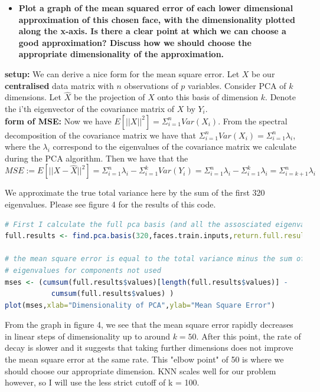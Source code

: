 \documentclass[11pt]{article}
\begin{document}
\begin{itemize}
\item \textbf{Plot a graph of the mean squared error of each lower dimensional approximation of this chosen face, with the dimensionality plotted along the x-axis. Is there a clear point at which we can choose a good approximation? Discuss how we should choose the appropriate dimensionality of the approximation.}
\end{itemize}
\textbf{setup:}
We can derive a nice form for the mean square error. Let $X$ be our \textbf{centralised} data matrix with $n$ observations of $p$ variables. Consider PCA of $k$ dimensions. Let $\hat{X}$ be the projection of $X$ onto this basis of dimension $k$. Denote the i'th eigenvector of the covariance matrix of $X$ by $Y_{i}$. \\
\textbf{form of MSE:}
Now we have $E[||X||^{2}] = \Sigma_{i=1}^{n} Var(X_{i})$. From the spectral decomposition of the covariance matrix we have that $\Sigma_{i=1}^{n} Var(X_{i}) = \Sigma_{i=1}^{n} \lambda_{i}$, where the $\lambda_{i}$ correspond to the eigenvalues of the covariance matrix we calculate during the PCA algorithm. Then we have that the $MSE := E[||X - \hat{X}  ||^{2}] = \Sigma_{i=1}^{n} \lambda_{i} - \Sigma_{i=1}^{k} Var(Y_{i}) =  \Sigma_{i=1}^{n} \lambda_{i} - \Sigma_{i=1}^{k} \lambda_{i} = \Sigma_{i=k+1}^{n} \lambda_{i}$

We approximate the true total variance here by the sum of the first 320 eigenvalues. Please see figure 4 for the results of this code. 

\begin{lstlisting}[linewidth=18.4cm,language=R]
# First I calculate the full pca basis (and all the assosciated eigenvalues)
full.results <- find.pca.basis(320,faces.train.inputs,return.full.results = TRUE)

# the mean square error is equal to the total variance minus the sum of the 
# eigenvalues for components not used 
mses <- (cumsum(full.results$values)[length(full.results$values)] - 
           cumsum(full.results$values) )
plot(mses,xlab="Dimensionality of PCA",ylab="Mean Square Error")
\end{lstlisting}


From the graph in figure 4, we see that the mean square error rapidly decreases in linear steps of dimensionality up to around $k = 50$. After this point, the rate of decay is slower and it suggests that taking further dimensions does not improve the mean square error at the same rate. This "elbow point" of 50 is where we should choose our appropriate dimension. KNN scales well for our problem however, so I will use the less strict cutoff of k = 100.
\end{document}
